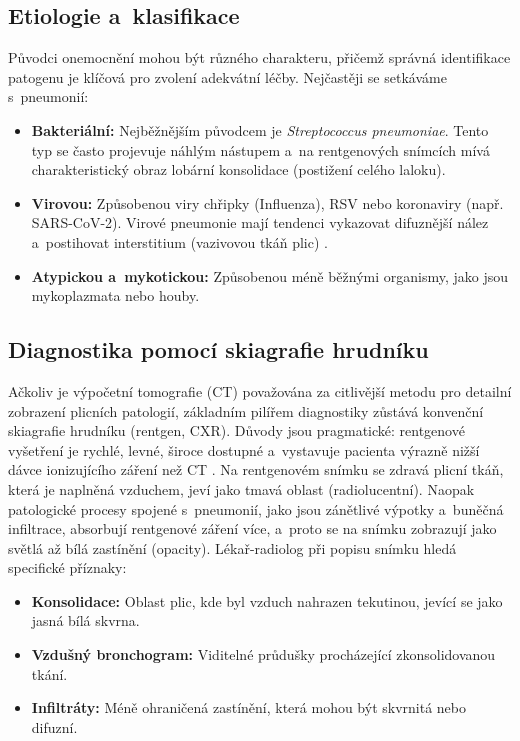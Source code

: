 \documentclass[12pt, a4paper]{report}
\begin{document}
\subsection{Etiologie a~klasifikace}
Původci onemocnění mohou být různého charakteru, přičemž správná identifikace patogenu je klíčová pro zvolení adekvátní léčby.
Nejčastěji se setkáváme s~pneumonií:
\begin{itemize}
    \item \textbf{Bakteriální:} Nejběžnějším původcem je \textit{Streptococcus pneumoniae}.
    Tento typ se často projevuje náhlým nástupem a~na rentgenových snímcích mívá charakteristický obraz lobární konsolidace (postižení celého laloku).
    \item \textbf{Virovou:} Způsobenou viry chřipky (Influenza), RSV nebo koronaviry (např. SARS-CoV-2).
    Virové pneumonie mají tendenci vykazovat difuznější nález a~postihovat interstitium (vazivovou tkáň plic) \cite{radiology_viral_vs_bacterial}.
    \item \textbf{Atypickou a~mykotickou:} Způsobenou méně běžnými organismy, jako jsou mykoplazmata nebo houby.
\end{itemize}

\subsection{Diagnostika pomocí skiagrafie hrudníku}
Ačkoliv je výpočetní tomografie (CT) považována za citlivější metodu pro detailní zobrazení plicních patologií, základním pilířem diagnostiky zůstává konvenční skiagrafie hrudníku (rentgen, CXR).
Důvody jsou pragmatické: rentgenové vyšetření je rychlé, levné, široce dostupné a~vystavuje pacienta výrazně nižší dávce ionizujícího záření než CT \cite{chest_xray_diagnosis}.
Na rentgenovém snímku se zdravá plicní tkáň, která je naplněná vzduchem, jeví jako tmavá oblast (radiolucentní).
Naopak patologické procesy spojené s~pneumonií, jako jsou zánětlivé výpotky a~buněčná infiltrace, absorbují rentgenové záření více, a~proto se na snímku zobrazují jako světlá až bílá zastínění (opacity).
Lékař-radiolog při popisu snímku hledá specifické příznaky:
\begin{itemize}
    \item \textbf{Konsolidace:} Oblast plic, kde byl vzduch nahrazen tekutinou, jevící se jako jasná bílá skvrna.
    \item \textbf{Vzdušný bronchogram:} Viditelné průdušky procházející zkonsolidovanou tkání.
    \item \textbf{Infiltráty:} Méně ohraničená zastínění, která mohou být skvrnitá nebo difuzní.
\end{itemize}
\end{document}
